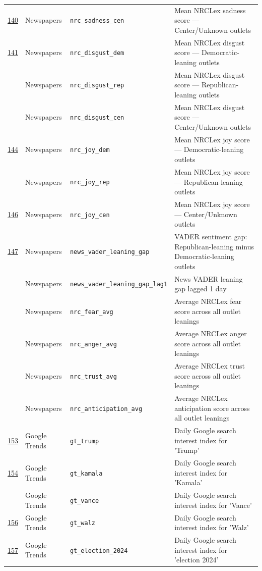 \begin{longtable}{>{\centering\arraybackslash}p{0.9cm} p{2cm} p{4cm} p{7.5cm}}
\underline{140} & Newspapers & \texttt{nrc\_sadness\_cen} & Mean NRCLex sadness score --- Center/Unknown outlets \\
\underline{141} & Newspapers & \texttt{nrc\_disgust\_dem} & Mean NRCLex disgust score --- Democratic-leaning outlets \\
142 & Newspapers & \texttt{nrc\_disgust\_rep} & Mean NRCLex disgust score --- Republican-leaning outlets \\
143 & Newspapers & \texttt{nrc\_disgust\_cen} & Mean NRCLex disgust score --- Center/Unknown outlets \\
\underline{144} & Newspapers & \texttt{nrc\_joy\_dem} & Mean NRCLex joy score --- Democratic-leaning outlets \\
145 & Newspapers & \texttt{nrc\_joy\_rep} & Mean NRCLex joy score --- Republican-leaning outlets \\
\underline{146} & Newspapers & \texttt{nrc\_joy\_cen} & Mean NRCLex joy score --- Center/Unknown outlets \\
\underline{147} & Newspapers & \texttt{news\_vader\_leaning\_gap} & VADER sentiment gap: Republican-leaning minus Democratic-leaning outlets \\
148 & Newspapers & \texttt{news\_vader\_leaning\_gap\_lag1} & News VADER leaning gap lagged 1 day \\
149 & Newspapers & \texttt{nrc\_fear\_avg} & Average NRCLex fear score across all outlet leanings \\
150 & Newspapers & \texttt{nrc\_anger\_avg} & Average NRCLex anger score across all outlet leanings \\
151 & Newspapers & \texttt{nrc\_trust\_avg} & Average NRCLex trust score across all outlet leanings \\
152 & Newspapers & \texttt{nrc\_anticipation\_avg} & Average NRCLex anticipation score across all outlet leanings \\
\underline{153} & Google Trends & \texttt{gt\_trump} & Daily Google search interest index for 'Trump' \\
\underline{154} & Google Trends & \texttt{gt\_kamala} & Daily Google search interest index for 'Kamala' \\
155 & Google Trends & \texttt{gt\_vance} & Daily Google search interest index for 'Vance' \\
\underline{156} & Google Trends & \texttt{gt\_walz} & Daily Google search interest index for 'Walz' \\
\underline{157} & Google Trends & \texttt{gt\_election\_2024} & Daily Google search interest index for 'election 2024' \\

\end{longtable}
